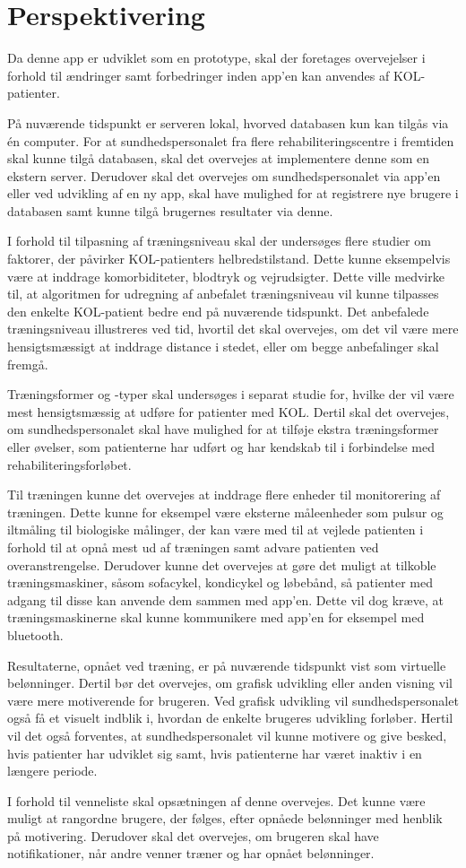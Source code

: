 \section{Perspektivering}
Da denne app er udviklet som en prototype, skal der foretages overvejelser i forhold til ændringer samt forbedringer inden app'en kan anvendes af KOL-patienter. 

På nuværende tidspunkt er serveren lokal, hvorved databasen kun kan tilgås via én computer. For at sundhedspersonalet fra flere rehabiliteringscentre i fremtiden skal kunne tilgå databasen, skal det overvejes at implementere denne som en ekstern server. Derudover skal det overvejes om sundhedspersonalet via app’en eller ved udvikling af en ny app, skal have mulighed for at registrere nye brugere i databasen samt kunne tilgå brugernes resultater via denne.  

I forhold til tilpasning af træningsniveau skal der undersøges flere studier om faktorer, der påvirker KOL-patienters helbredstilstand. Dette kunne eksempelvis være at inddrage komorbiditeter, blodtryk og vejrudsigter. Dette ville medvirke til, at algoritmen for udregning af anbefalet træningsniveau vil kunne tilpasses den enkelte KOL-patient bedre end på nuværende tidspunkt. Det anbefalede træningsniveau illustreres ved tid, hvortil det skal overvejes, om det vil være mere hensigtsmæssigt at inddrage distance i stedet, eller om begge anbefalinger skal fremgå. 

Træningsformer og -typer skal undersøges i separat studie for, hvilke der vil være mest hensigtsmæssig at udføre for patienter med KOL. Dertil skal det overvejes, om sundhedspersonalet skal have mulighed for at tilføje ekstra træningsformer eller øvelser, som patienterne har udført og har kendskab til i forbindelse med rehabiliteringsforløbet.

Til træningen kunne det overvejes at inddrage flere enheder til monitorering af træningen. Dette kunne for eksempel være eksterne måleenheder som pulsur og iltmåling til biologiske målinger, der kan være med til at vejlede patienten i forhold til at opnå mest ud af træningen samt advare patienten ved overanstrengelse. Derudover kunne det overvejes at gøre det muligt at tilkoble træningsmaskiner, såsom sofacykel, kondicykel og løbebånd, så patienter med adgang til disse kan anvende dem sammen med app’en. Dette vil dog kræve, at træningsmaskinerne skal kunne kommunikere med app’en for eksempel med bluetooth. 

Resultaterne, opnået ved træning, er på nuværende tidspunkt vist som virtuelle belønninger. Dertil bør det overvejes, om grafisk udvikling eller anden visning vil være mere motiverende for  brugeren. Ved grafisk udvikling vil sundhedspersonalet også få et visuelt indblik i, hvordan de enkelte brugeres udvikling forløber. Hertil vil det også forventes, at sundhedspersonalet vil kunne motivere og give besked, hvis patienter har udviklet sig samt, hvis patienterne har været inaktiv i en længere periode. 

I forhold til venneliste skal opsætningen af denne overvejes. Det kunne være muligt at rangordne brugere, der følges, efter opnåede belønninger med henblik på motivering. Derudover skal det overvejes, om brugeren skal have notifikationer, når andre venner træner og har opnået belønninger. 